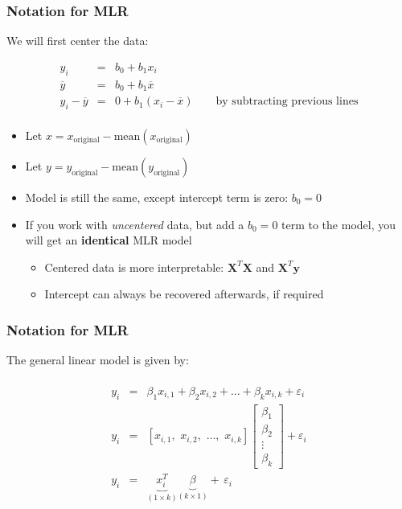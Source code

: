 \begin{frame}\frametitle{Notation for MLR}

	We will first center the data:

	$$
	\begin{array}{rcl}
		y_i &=& b_0 + b_1 x_i \\
		\overline{y} &=& b_0 + b_1 \overline{x} \\
		y_i - \overline{y} &=& 0 +b_1(x_i - \overline{x}) \qquad \text{by subtracting previous lines} \\
	\end{array}
	$$
	\begin{itemize}
		\item	Let $x = x_\text{original} - \text{mean}\left(x_\text{original} \right)$
		\item	Let $y = y_\text{original} - \text{mean}\left(y_\text{original} \right)$
		\item	Model is still the same, except intercept term is zero: $b_0 = 0$
	\end{itemize}
	\begin{itemize}
		\item	If you work with \emph{uncentered} data, but add a $b_0 = 0$ term to the model, you will get an \textbf{identical} MLR model
		\begin{itemize}
			\item	Centered data is more interpretable: $\mathbf{X}^T\mathbf{X}$ and $\mathbf{X}^T\mathbf{y}$
			\item	Intercept can always be recovered afterwards, if required
		\end{itemize}
	\end{itemize}
\end{frame}

\begin{frame}\frametitle{Notation for MLR}

	The general linear model is given by:

	$$
	\begin{array}{rcl}
		\\
		y_i &=& \beta_1 x_{i,1} + \beta_2x_{i,2} + \ldots + \beta_kx_{i,k} + \varepsilon_i \\
		y_i &=& [x_{i,1},\,\, x_{i,2},\,\, \ldots,\,\, x_{i,k}]
		\begin{bmatrix}
			\beta_1 \\
			\beta_2 \\
			\vdots \\
			\beta_k
		\end{bmatrix}
		+ \varepsilon_i \\
		y_i &=& \underbrace{\mathit{x}_i^T}_{(1 \times k)} \underbrace{\beta}_{(k \times 1)} + \,\varepsilon_i
	\end{array}
	$$
\end{frame}

